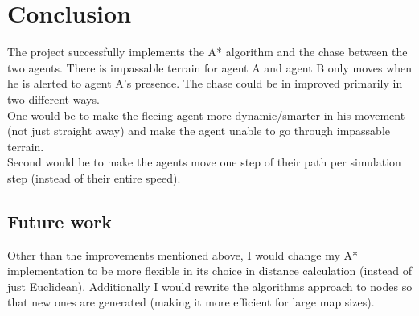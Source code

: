 \section{Conclusion}
The project successfully implements the A* algorithm and the chase between the two agents. There is impassable terrain for agent A and agent B only moves when he is alerted to agent A's presence. The chase could be in improved primarily in two different ways. 
\\One would be to make the fleeing agent more dynamic/smarter in his movement (not just straight away) and make the agent unable to go through impassable terrain.
\\Second would be to make the agents move one step of their path per simulation step (instead of their entire speed).

\subsection{Future work}
Other than the improvements mentioned above, I would change my A* implementation to be more flexible in its choice in distance calculation (instead of just Euclidean). Additionally I would rewrite the algorithms approach to nodes so that new ones are generated (making it more efficient for large map sizes).
